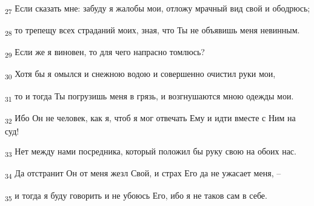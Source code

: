 \begin{tcolorbox}
\textsubscript{27} Если сказать мне: забуду я жалобы мои, отложу мрачный вид свой и ободрюсь;
\end{tcolorbox}
\begin{tcolorbox}
\textsubscript{28} то трепещу всех страданий моих, зная, что Ты не объявишь меня невинным.
\end{tcolorbox}
\begin{tcolorbox}
\textsubscript{29} Если же я виновен, то для чего напрасно томлюсь?
\end{tcolorbox}
\begin{tcolorbox}
\textsubscript{30} Хотя бы я омылся и снежною водою и совершенно очистил руки мои,
\end{tcolorbox}
\begin{tcolorbox}
\textsubscript{31} то и тогда Ты погрузишь меня в грязь, и возгнушаются мною одежды мои.
\end{tcolorbox}
\begin{tcolorbox}
\textsubscript{32} Ибо Он не человек, как я, чтоб я мог отвечать Ему и идти вместе с Ним на суд!
\end{tcolorbox}
\begin{tcolorbox}
\textsubscript{33} Нет между нами посредника, который положил бы руку свою на обоих нас.
\end{tcolorbox}
\begin{tcolorbox}
\textsubscript{34} Да отстранит Он от меня жезл Свой, и страх Его да не ужасает меня, --
\end{tcolorbox}
\begin{tcolorbox}
\textsubscript{35} и тогда я буду говорить и не убоюсь Его, ибо я не таков сам в себе.
\end{tcolorbox}
